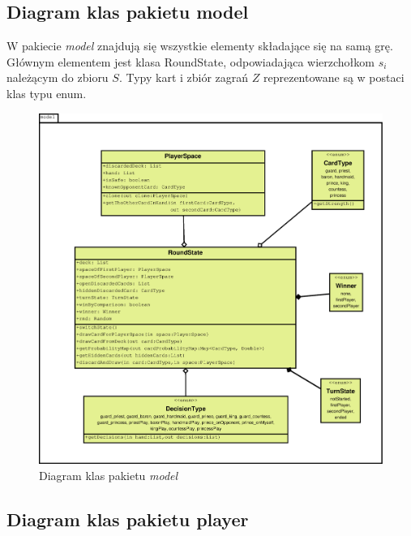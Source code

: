 \subsection{Diagram klas pakietu model}

W pakiecie \textit{model} znajdują się wszystkie elementy składające się na samą grę. Głównym elementem jest klasa RoundState, odpowiadająca wierzchołkom $s_i$ należącym do zbioru $S$. Typy kart i zbiór zagrań $Z$ reprezentowane są w postaci klas typu enum.

\begin{figure}[H]
	\centering
	\includegraphics[width=\textwidth]{Resources/diagramKlas_model.eps}
	\caption{Diagram klas pakietu \textit{model}} 
	\label{fig:diagramKlasModel}
\end{figure}

\subsection{Diagram klas pakietu player}

